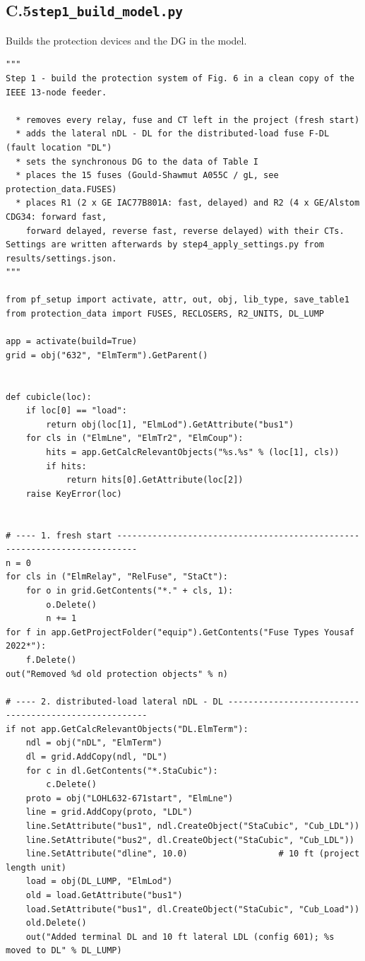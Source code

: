 \documentclass[12pt,a4paper]{article}
\begin{document}
\subsection*{C.5\quad \texttt{step1\_build\_model.py}}
Builds the protection devices and the DG in the model.
\begin{lstlisting}
"""
Step 1 - build the protection system of Fig. 6 in a clean copy of the IEEE 13-node feeder.

  * removes every relay, fuse and CT left in the project (fresh start)
  * adds the lateral nDL - DL for the distributed-load fuse F-DL (fault location "DL")
  * sets the synchronous DG to the data of Table I
  * places the 15 fuses (Gould-Shawmut A055C / gL, see protection_data.FUSES)
  * places R1 (2 x GE IAC77B801A: fast, delayed) and R2 (4 x GE/Alstom CDG34: forward fast,
    forward delayed, reverse fast, reverse delayed) with their CTs.
Settings are written afterwards by step4_apply_settings.py from results/settings.json.
"""

from pf_setup import activate, attr, out, obj, lib_type, save_table1
from protection_data import FUSES, RECLOSERS, R2_UNITS, DL_LUMP

app = activate(build=True)
grid = obj("632", "ElmTerm").GetParent()


def cubicle(loc):
    if loc[0] == "load":
        return obj(loc[1], "ElmLod").GetAttribute("bus1")
    for cls in ("ElmLne", "ElmTr2", "ElmCoup"):
        hits = app.GetCalcRelevantObjects("%s.%s" % (loc[1], cls))
        if hits:
            return hits[0].GetAttribute(loc[2])
    raise KeyError(loc)


# ---- 1. fresh start --------------------------------------------------------------------------
n = 0
for cls in ("ElmRelay", "RelFuse", "StaCt"):
    for o in grid.GetContents("*." + cls, 1):
        o.Delete()
        n += 1
for f in app.GetProjectFolder("equip").GetContents("Fuse Types Yousaf 2022*"):
    f.Delete()
out("Removed %d old protection objects" % n)

# ---- 2. distributed-load lateral nDL - DL ------------------------------------------------------
if not app.GetCalcRelevantObjects("DL.ElmTerm"):
    ndl = obj("nDL", "ElmTerm")
    dl = grid.AddCopy(ndl, "DL")
    for c in dl.GetContents("*.StaCubic"):
        c.Delete()
    proto = obj("LOHL632-671start", "ElmLne")
    line = grid.AddCopy(proto, "LDL")
    line.SetAttribute("bus1", ndl.CreateObject("StaCubic", "Cub_LDL"))
    line.SetAttribute("bus2", dl.CreateObject("StaCubic", "Cub_LDL"))
    line.SetAttribute("dline", 10.0)                  # 10 ft (project length unit)
    load = obj(DL_LUMP, "ElmLod")
    old = load.GetAttribute("bus1")
    load.SetAttribute("bus1", dl.CreateObject("StaCubic", "Cub_Load"))
    old.Delete()
    out("Added terminal DL and 10 ft lateral LDL (config 601); %s moved to DL" % DL_LUMP)


\end{lstlisting}
\end{document}
